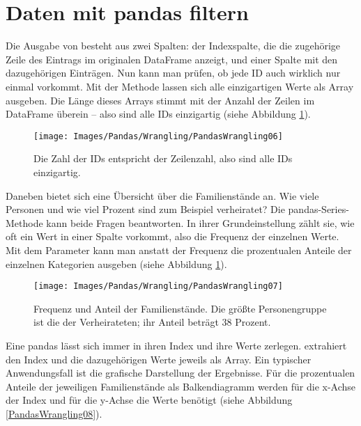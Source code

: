 
\section{Daten mit pandas filtern}


Die Ausgabe von  besteht aus zwei Spalten: der Indexspalte, die die zugehörige Zeile des Eintrags im originalen DataFrame anzeigt, und einer Spalte mit den dazugehörigen Einträgen. Nun kann man prüfen, ob jede ID auch wirklich nur einmal vorkommt. Mit der Methode  lassen sich alle einzigartigen Werte als Array ausgeben. Die Länge dieses Arrays stimmt mit der Anzahl der Zeilen im DataFrame überein -- also sind alle IDs einzigartig (siehe Abbildung \ref{PandasWrangling06}).

\begin{figure}
    \centering
    \texttt{[image: Images/Pandas/Wrangling/PandasWrangling06]}    
    \caption{Die Zahl der IDs entspricht der Zeilenzahl, also sind alle IDs einzigartig.} \label{PandasWrangling06}
\end{figure}

Daneben bietet sich eine Übersicht über die Familienstände an. Wie viele Personen und wie viel Prozent sind zum Beispiel verheiratet? Die pandas-Series-Methode  kann beide Fragen beantworten. In ihrer Grundeinstellung zählt sie, wie oft ein Wert in einer Spalte vorkommt, also die Frequenz der einzelnen Werte. Mit dem Parameter  kann man anstatt der Frequenz die prozentualen Anteile der einzelnen Kategorien ausgeben (siehe Abbildung \ref{PandasWrangling06}).

\begin{figure}
    \centering
    \texttt{[image: Images/Pandas/Wrangling/PandasWrangling07]}    
    \caption{Frequenz und Anteil der Familienstände. Die größte Personengruppe ist die der Verheirateten; ihr Anteil beträgt 38 Prozent.} \label{PandasWrangling07}
\end{figure}

Eine pandas  lässt sich immer in ihren Index und ihre Werte zerlegen.  extrahiert den Index und  die dazugehörigen Werte jeweils als Array. Ein typischer Anwendungsfall ist die grafische Darstellung der Ergebnisse. Für die prozentualen Anteile der jeweiligen Familienstände als Balkendiagramm werden für die x-Achse der Index und für die y-Achse die Werte benötigt (siehe Abbildung \ref{PandasWrangling08}).


